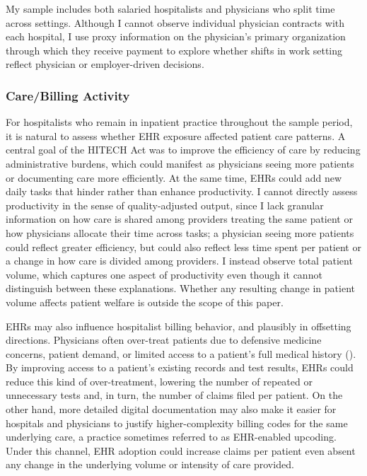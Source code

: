 \documentclass[12pt]{article}
\begin{document}
My sample includes both salaried hospitalists and physicians who split time across settings. Although I cannot observe individual physician contracts with each hospital, I use proxy information on the physician's primary organization through which they receive payment to explore whether shifts in work setting reflect physician or employer-driven decisions.

\subsubsection{Care/Billing Activity}

For hospitalists who remain in inpatient practice throughout the sample period, it is natural to assess whether EHR exposure affected patient care patterns. A central goal of the HITECH Act was to improve the efficiency of care by reducing administrative burdens, which could manifest as physicians seeing more patients or documenting care more efficiently. At the same time, EHRs could add new daily tasks that hinder rather than enhance productivity. I cannot directly assess productivity in the sense of quality-adjusted output, since I lack granular information on how care is shared among providers treating the same patient or how physicians allocate their time across tasks; a physician seeing more patients could reflect greater efficiency, but could also reflect less time spent per patient or a change in how care is divided among providers. I instead observe total patient volume, which captures one aspect of productivity even though it cannot distinguish between these explanations. Whether any resulting change in patient volume affects patient welfare is outside the scope of this paper.

EHRs may also influence hospitalist billing behavior, and plausibly in offsetting directions. Physicians often over-treat patients due to defensive medicine concerns, patient demand, or limited access to a patient's full medical history (\cite{lyu2017overtreatment}). By improving access to a patient's existing records and test results, EHRs could reduce this kind of over-treatment, lowering the number of repeated or unnecessary tests and, in turn, the number of claims filed per patient. On the other hand, more detailed digital documentation may also make it easier for hospitals and physicians to justify higher-complexity billing codes for the same underlying care, a practice sometimes referred to as EHR-enabled upcoding. Under this channel, EHR adoption could increase claims per patient even absent any change in the underlying volume or intensity of care provided.
\end{document}
